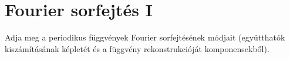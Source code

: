 \documentclass[../main.tex]{subfiles}
\begin{document}
\section{Fourier sorfejtés I}

\begin{fulltheorem}
	Adja meg a periodikus függvények Fourier sorfejtésének módjait
	(együtthatók kiszámításának képletét és a függvény rekonstrukcióját
	komponensekből).
\end{fulltheorem}
\end{document}
